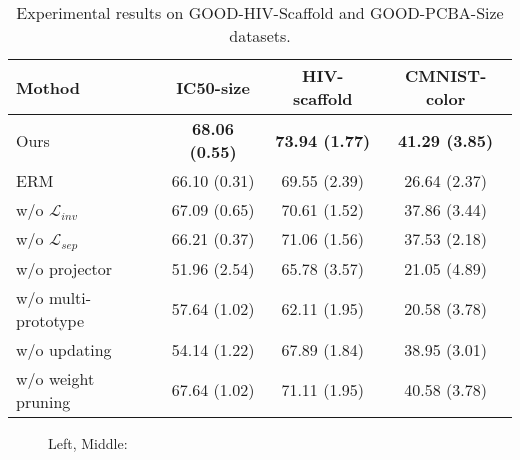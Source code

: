 

\begin{table}[ht]\label{ablation}
\centering
\begin{tabular}{lccc}
\toprule
 Mothod &IC50-size &HIV-scaffold &CMNIST-color \\
\midrule
Ours & \textbf{68.06 (0.55)} & \textbf{73.94 (1.77)} & \textbf{41.29 (3.85)}  \\
ERM & 66.10 (0.31) & 69.55 (2.39) & 26.64 (2.37)  \\
\midrule

w/o $\mathcal{L}_{inv}$ & 67.09 (0.65) & 70.61 (1.52) & 37.86 (3.44)  \\
w/o $\mathcal{L}_{sep}$ & 66.21 (0.37)  & 71.06 (1.56) & 37.53 (2.18) \\
\midrule
w/o projector & 51.96 (2.54) & 65.78 (3.57) & 21.05 (4.89) \\
w/o multi-prototype & 57.64 (1.02) & 62.11 (1.95) & 20.58 (3.78)  \\
\midrule
w/o updating & 54.14 (1.22) & 67.89 (1.84) & 38.95 (3.01)  \\
w/o weight pruning & 67.64 (1.02) & 71.11 (1.95) & 40.58 (3.78) \\
\bottomrule
\end{tabular}
\caption{Experimental results on GOOD-HIV-Scaffold and GOOD-PCBA-Size datasets.}
\end{table}



\begin{figure*}[h]
\centering 
{}
\caption{Left, Middle:} 
\label{hyperparameter}
\vspace{-1pt}
\end{figure*}

